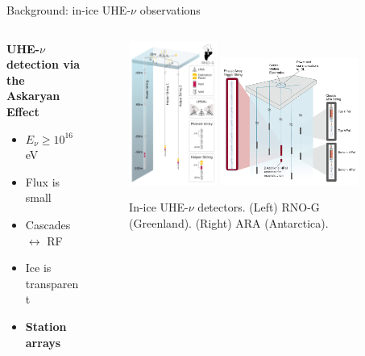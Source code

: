 \documentclass{beamer}
\begin{document}
\begin{frame}{Background: in-ice UHE-$\nu$ observations}
\small
\begin{columns}[T]
\begin{column}{0.32\textwidth}
\textbf{\alert{UHE-$\nu$ detection via the Askaryan Effect}}
\begin{itemize}
\item $E_{\nu} \geq 10^{16}$ eV
\item Flux is small
\item Cascades $\leftrightarrow$ RF
\item Ice is transparent
\item \textbf{Station arrays}
\end{itemize}
\end{column}
\begin{column}{0.68\textwidth}
\begin{figure}
\centering
\includegraphics[width=0.35\textwidth]{RNO-G.png} \hspace{0.5cm}
\includegraphics[width=0.55\textwidth]{ARA.png}
\caption{\footnotesize In-ice UHE-$\nu$ detectors. (Left) RNO-G (Greenland). (Right) ARA (Antarctica).}
\end{figure}
\end{column}
\end{columns}
\end{frame}
\end{document}
